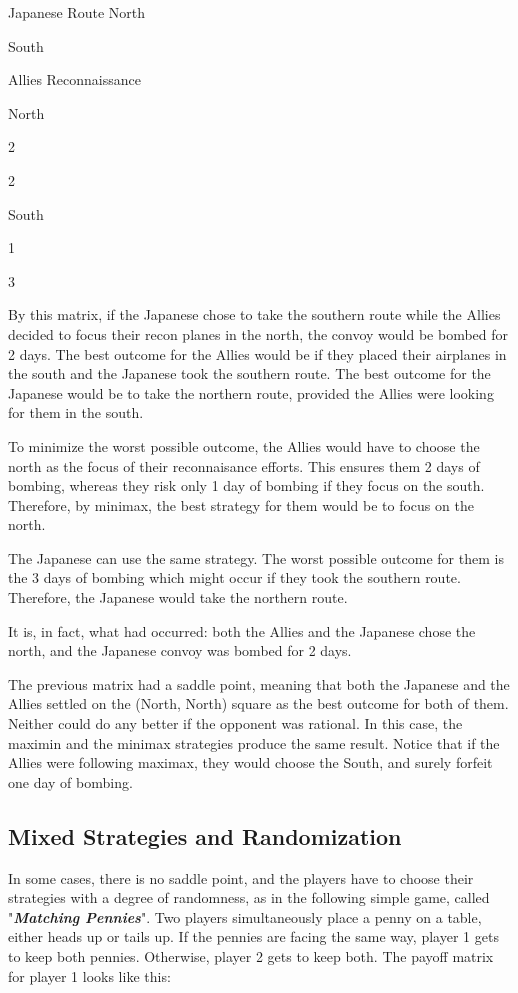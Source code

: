 \documentclass[]{report}
\begin{document}
Japanese Route
North

South

Allies Reconnaissance

North

2

2

South

1

3


By this matrix, if the Japanese chose to take the southern route while the Allies decided to focus their recon planes in the north, the convoy would be bombed for 2 days. The best outcome for the Allies would be if they placed their airplanes in the south and the Japanese took the southern route. The best outcome for the Japanese would be to take the northern route, provided the Allies were looking for them in the south.

To minimize the worst possible outcome, the Allies would have to choose the north as the focus of their reconnaisance efforts. This ensures them 2 days of bombing, whereas they risk only 1 day of bombing if they focus on the south. Therefore, by minimax, the best strategy for them would be to focus on the north.

The Japanese can use the same strategy. The worst possible outcome for them is the 3 days of bombing which might occur if they took the southern route. Therefore, the Japanese would take the northern route.

It is, in fact, what had occurred: both the Allies and the Japanese chose the north, and the Japanese convoy was bombed for 2 days.

The previous matrix had a saddle point, meaning that both the Japanese and the Allies settled on the (North, North) square as the best outcome for both of them. Neither could do any better if the opponent was rational. In this case, the maximin and the minimax strategies produce the same result. Notice that if the Allies were following maximax, they would choose the South, and surely forfeit one day of bombing.


\subsection{Mixed Strategies and Randomization}

In some cases, there is no saddle point, and the players have to choose their strategies with a degree of randomness, as in the following simple game, called "\textbf{\textit{Matching Pennies}}". Two players simultaneously place a penny on a table, either heads up or tails up. If the pennies are facing the same way, player 1 gets to keep both pennies. Otherwise, player 2 gets to keep both. The payoff matrix for player 1 looks like this:
\end{document}

